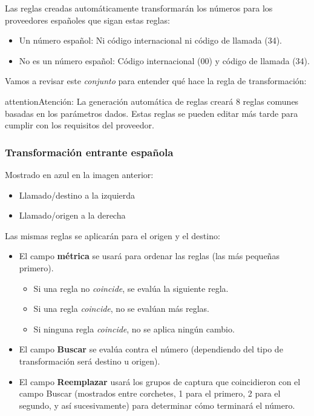 \documentclass[letterpaper,10pt,spanish]{sphinxmanual}
\begin{document}
Las reglas creadas automáticamente transformarán los números para los proveedores españoles que sigan estas reglas:
\begin{itemize}
\item {} 
Un número español: Ni código internacional ni código de llamada (34).

\item {} 
No es un número español: Código internacional (00) y código de llamada (34).

\end{itemize}

Vamos a revisar este \emph{conjunto} para entender qué hace la regla de transformación:

\begin{notice}{attention}{Atención:}
La generación automática de reglas creará 8 reglas comunes basadas en los parámetros dados. Estas reglas se pueden editar más tarde para cumplir con los requisitos del proveedor.
\end{notice}


\subsubsection{Transformación entrante española}
\label{administration_portal/brand/settings/numeric_transformations:spanish-incoming-transformation}
Mostrado en azul en la imagen anterior:
\begin{itemize}
\item {} 
Llamado/destino a la izquierda

\item {} 
Llamado/origen a la derecha

\end{itemize}

Las mismas reglas se aplicarán para el origen y el destino:
\begin{itemize}
\item {} 
El campo \textbf{métrica} se usará para ordenar las reglas (las más pequeñas primero).
\begin{itemize}
\item {} 
Si una regla no \emph{coincide}, se evalúa la siguiente regla.

\item {} 
Si una regla \emph{coincide}, no se evalúan más reglas.

\item {} 
Si ninguna regla \emph{coincide}, no se aplica ningún cambio.

\end{itemize}

\item {} 
El campo \textbf{Buscar} se evalúa contra el número (dependiendo del tipo de transformación será destino u origen).

\item {} 
El campo \textbf{Reemplazar} usará los grupos de captura que coincidieron con el campo Buscar (mostrados entre corchetes, 1 para el primero, 2 para el segundo, y así sucesivamente) para determinar cómo terminará el número.

\end{itemize}
\end{document}

